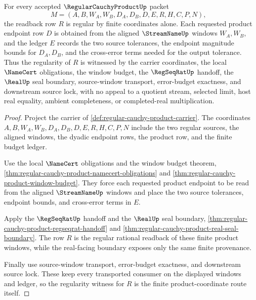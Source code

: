 \begin{theorem}
\label{thm:regular-cauchy-product-coordinate-regularity}
For every accepted $\RegularCauchyProductUp$ packet
$$
M=(A,B,W_A,W_B,D_A,D_B,D,E,R,H,C,P,N),
$$
the readback row $R$ is regular by finite coordinates alone. Each requested product endpoint row $D$ is obtained from the aligned $\StreamNameUp$ windows $W_A,W_B$, and the ledger $E$ records the two source tolerances, the endpoint magnitude bounds for $D_A,D_B$, and the cross-error terms needed for the output tolerance. Thus the regularity of $R$ is witnessed by the carrier coordinates, the local $\NameCert$ obligations, the window budget, the $\RegSeqRatUp$ handoff, the $\RealUp$ seal boundary, source-window transport, error-budget exactness, and downstream source lock, with no appeal to a quotient stream, selected limit, host real equality, ambient completeness, or completed-real multiplication.
\end{theorem}
\begin{proof}
Project the carrier of \autoref{def:regular-cauchy-product-carrier}. The coordinates $A,B,W_A,W_B,D_A,D_B,D,E,R,H,C,P,N$ include the two regular sources, the aligned windows, the dyadic endpoint rows, the product row, and the finite budget ledger.

Use the local $\NameCert$ obligations and the window budget theorem, \autoref{thm:regular-cauchy-product-namecert-obligations} and \autoref{thm:regular-cauchy-product-window-budget}. They force each requested product endpoint to be read from the aligned $\StreamNameUp$ windows and place the two source tolerances, endpoint bounds, and cross-error terms in $E$.

Apply the $\RegSeqRatUp$ handoff and the $\RealUp$ seal boundary, \autoref{thm:regular-cauchy-product-regseqrat-handoff} and \autoref{thm:regular-cauchy-product-real-seal-boundary}. The row $R$ is the regular rational readback of these finite product windows, while the real-facing boundary exposes only the same finite provenance.

Finally use source-window transport, error-budget exactness, and downstream source lock. These keep every transported consumer on the displayed windows and ledger, so the regularity witness for $R$ is the finite product-coordinate route itself.
\end{proof}


